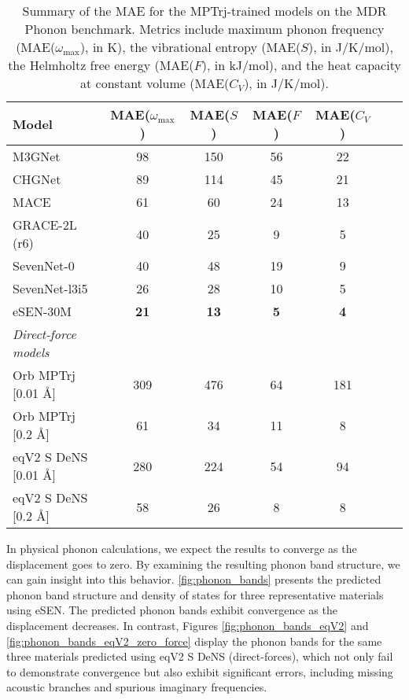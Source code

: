 \documentclass[twocolumn]{fairmeta}
\newcommand{\ourmodel}{eSEN}
\begin{document}
\begin{table}[t]
    \centering
    \label{tab:mdr-phonons}
    \caption{Summary of the MAE for the MPTrj-trained models on the MDR Phonon benchmark. Metrics include maximum phonon frequency (MAE($\omega_{\mathrm{max}}$), in K), the vibrational entropy (MAE($S$), in J/K/mol), the Helmholtz free energy (MAE($F$), in kJ/mol), and the heat capacity at constant volume (MAE($C_V$), in J/K/mol).
    \label{tab:mae_models}}
    \begin{adjustbox}{width=\linewidth}
    \begin{tabular}{lcccccc}
    \toprule
    Model & MAE($\omega_{\text{max}}$) & MAE($S$) & MAE($F$) & MAE($C_V$) \\
    \midrule
    M3GNet & 98 & 150 & 56 & 22 \\
    CHGNet & 89 & 114 & 45 & 21 \\
    MACE & 61 & 60 & 24 & 13 \\
    GRACE-2L (r6) & 40 & 25 & 9 & 5 \\
    SevenNet-0 & 40 & 48 & 19 & 9 \\
    SevenNet-l3i5 & 26 & 28 & 10 & 5 \\
    \ourmodel-30M & \textbf{21} & \textbf{13} & \textbf{5} & \textbf{4} \\
    \midrule
    \textit{Direct-force models} & & & & \\
    \midrule
    Orb MPTrj [0.01 \AA] & 309 & 476 & 64 & 181 \\
    Orb MPTrj [0.2 \AA] & 61 & 34 & 11 & 8 \\
    eqV2 S DeNS [0.01 \AA] & 280 & 224 & 54 & 94 \\
    eqV2 S DeNS [0.2 \AA] & 58 & 26 & 8 & 8 \\
    \bottomrule
    \end{tabular}
    \end{adjustbox}
\end{table}

In physical phonon calculations, we expect the results to converge as the displacement goes to zero. By examining the resulting phonon band structure, we can gain insight into this behavior. \cref{fig:phonon_bands} presents the predicted phonon band structure and density of states for three representative materials using \ourmodel. The predicted phonon bands exhibit convergence as the displacement decreases. In contrast, Figures \cref{fig:phonon_bands_eqV2} and \cref{fig:phonon_bands_eqV2_zero_force} display the phonon bands for the same three materials predicted using eqV2 S DeNS (direct-forces), which not only fail to demonstrate convergence but also exhibit significant errors, including missing acoustic branches and spurious imaginary frequencies.
\end{document}
